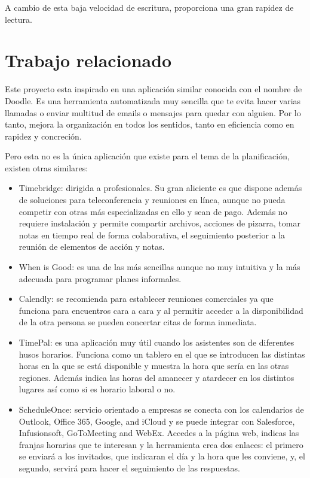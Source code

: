 \documentclass[a4paper, 12pt]{book}
\begin{document}
A cambio de esta baja velocidad de escritura, proporciona una gran rapidez de lectura.



\section{Trabajo relacionado}
\label{sec:relacionado}

Este proyecto esta inspirado en una aplicaci\'on similar conocida con el nombre de Doodle. Es una herramienta automatizada muy sencilla que te evita hacer varias llamadas o enviar multitud de emails o mensajes para quedar con alguien. Por lo tanto, mejora la organizaci\'on en todos los sentidos, tanto en eficiencia como en rapidez y concreci\'on.

Pero esta no es la \'unica aplicaci\'on que existe para el tema de la planificaci\'on, existen otras similares:

\begin{itemize}
  \item Timebridge\cite{Timebridge}: dirigida a profesionales. Su gran aliciente es que dispone adem\'as de soluciones para teleconferencia y reuniones en l\'inea, aunque no pueda competir con otras m\'as especializadas en ello y sean de pago. Adem\'as no requiere instalaci\'on y permite compartir archivos, acciones de pizarra, tomar notas en tiempo real de forma colaborativa, el seguimiento posterior a la reuni\'on de elementos de acci\'on y notas.
 \item When is Good\cite{WhenIsGood}: es una de las m\'as sencillas aunque no muy intuitiva y la m\'as adecuada para programar planes informales.
 \item Calendly\cite{Calendly}: se recomienda para establecer reuniones comerciales ya que funciona para encuentros cara a cara y al permitir acceder a la disponibilidad de la otra persona se pueden concertar citas de forma inmediata. 
 \item TimePal\cite{TimePal}: es una aplicaci\'on muy \'util cuando los asistentes son de diferentes husos horarios. Funciona como un tablero en el que se introducen las distintas horas en la que se est\'a disponible y muestra la hora que ser\'ia en las otras regiones. Adem\'as indica las horas del amanecer y atardecer en los distintos lugares as\'i como si es horario laboral o no.
 \item ScheduleOnce\cite{ScheduleOnce}: servicio orientado a empresas se conecta con los calendarios de Outlook, Office 365, Google, and iCloud y se puede integrar con Salesforce, Infusionsoft, GoToMeeting and WebEx.  Accedes a la p\'agina web, indicas las franjas horarias que te interesan y la herramienta crea dos enlaces: el primero se enviar\'a a los invitados, que indicaran el d\'ia y la hora que les conviene, y, el segundo, servir\'a para hacer el seguimiento de las respuestas.
\end{itemize}
\end{document}
